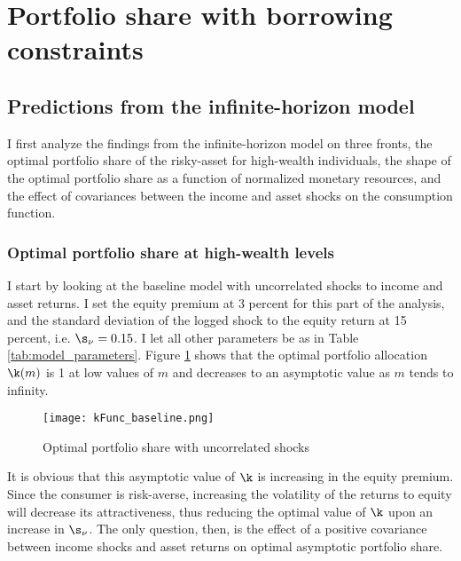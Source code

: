 \section{Portfolio share with borrowing constraints}\label{results}

\subsection{Predictions from the infinite-horizon model}

I first analyze the findings from the infinite-horizon model on three fronts, the optimal portfolio share of the risky-asset for high-wealth individuals, the shape of the optimal portfolio share as a function of normalized monetary resources, and the effect of covariances between the income and asset shocks on the consumption function.

\subsubsection{Optimal portfolio share at high-wealth levels}

I start by looking at the baseline model with uncorrelated shocks to income and asset returns. I set the equity premium at 3 percent for this part of the analysis, and the standard deviation of the logged shock to the equity return at 15 percent, i.e. $\s_{\nu} = 0.15$. I let all other parameters be as in Table \ref{tab:model_parameters}. Figure \ref{fig:baseline_portfolio} shows that the optimal portfolio allocation $\k(m)$ is 1 at low values of $m$ and decreases to an asymptotic value as $m$ tends to infinity.

\begin{figure}[h]
    \centering
    \texttt{[image: kFunc\_baseline.png]}
    \caption{Optimal portfolio share with uncorrelated shocks}
    \label{fig:baseline_portfolio}
\end{figure}

It is obvious that this asymptotic value of $\k$ is increasing in the equity premium. Since the consumer is risk-averse, increasing the volatility of the returns to equity will decrease its attractiveness, thus reducing the optimal value of $\k$ upon an increase in $\s_{\nu}$. The only question, then, is the effect of a positive covariance between income shocks and asset returns on optimal asymptotic portfolio share.

